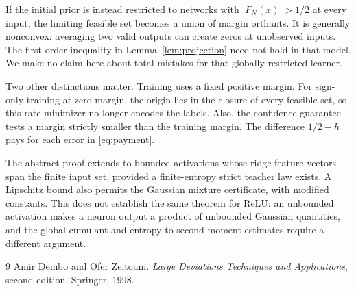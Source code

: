 \documentclass[11pt]{article}
\begin{document}
If the initial prior is instead restricted to networks with
$|F_N(x)|>1/2$ at every input, the limiting feasible set becomes a union
of margin orthants. It is generally nonconvex: averaging two valid
outputs can create zeros at unobserved inputs. The first-order inequality
in Lemma~\ref{lem:projection} need not hold in that model. We make no
claim here about total mistakes for that globally restricted learner.

Two other distinctions matter. Training uses a fixed positive margin.
For sign-only training at zero margin, the origin lies in the closure of
every feasible set, so this rate minimizer no longer encodes the labels.
Also, the confidence guarantee tests a margin strictly smaller than the
training margin. The difference $1/2-h$ pays for each error in
\eqref{eq:payment}.

The abstract proof extends to bounded activations whose ridge feature
vectors span the finite input set, provided a finite-entropy strict
teacher law exists. A Lipschitz bound also permits the Gaussian mixture
certificate, with modified constants. This does not establish the same
theorem for ReLU: an unbounded activation makes a neuron output a product
of unbounded Gaussian quantities, and the global cumulant and
entropy-to-second-moment estimates require a different argument.

\begin{thebibliography}{9}
Amir Dembo and Ofer Zeitouni.
\emph{Large Deviations Techniques and Applications}, second edition.
Springer, 1998.
\end{thebibliography}
\end{document}
